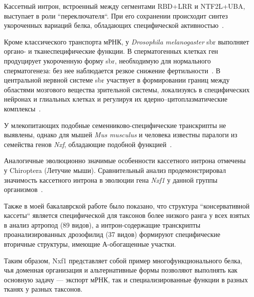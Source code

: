 Кассетный интрон, встроенный между сегментами RBD+LRR и NTF2L+UBA, выступает в роли ``переключателя``.
При его сохранении происходит синтез укороченных вариаций белка, обладающих специфической активностью~\cite{Mamon2013}.

Кроме классического транспорта мРНК, у \textit{Drosophila melanogaster} sbr выполняет органо- и тканеспецифические функции.
В сперматогенных клетках ген продуцирует укороченную форму sbr, необходимую для нормального сперматогенеза: без нее наблюдается резкое снижение фертильности~\cite{Ginanova2016}.
В центральной нервной системе sbr участвует в формировании границ между областями мозгового вещества зрительной системы, локализуясь в специфических нейронах и глиальных клетках и регулируя их ядерно–цитоплазматические комплексы~\cite{Mamon2021}.

У млекопитающих подобные семенниково-специфические транскрипты не выявлены, однако для мышей \textit{Mus musculus} и человека известны паралоги из семейства генов \textit{Nxf}, обладающие подобной функцией~\cite{Mamon2019}.

Аналогичные эволюционно значимые особенности кассетного интрона отмечены у Chiroptera (Летучие мыши).
Сравнительный анализ продемонстрировал значимость кассетного интрона в эволюции гена \textit{Nxf1} у данной группы организмов~\cite{Bondaruk2022}.

Также в моей бакалаврской работе было показано, что структура ``консервативной кассеты`` является специфической для таксонов более низкого ранга у всех взятых в анализ артропод (89 видов), а интрон-содержащие транскрипты проанализированных дрозофилид (37 видов) формируют специфические вторичные структуры, имеющие А-обогащенные участки.

Таким образом, Nxf1 представляет собой пример многофункционального белка, чья доменная организация и альтернативные формы позволяют выполнять как основную задачу — экспорт мРНК, так и специализированные функции в разных тканях у разных таксонов.
